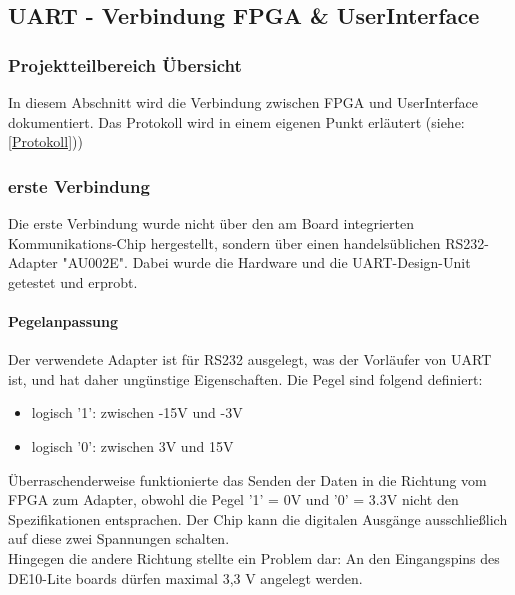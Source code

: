 \subsection{UART - Verbindung FPGA \& UserInterface}
\subsubsection{Projektteilbereich Übersicht}
In diesem Abschnitt wird die Verbindung zwischen FPGA und UserInterface dokumentiert. Das Protokoll wird in einem eigenen Punkt erläutert  (siehe: \ref{Protokoll}))
\subsubsection{erste Verbindung}
Die erste Verbindung wurde nicht über den am Board integrierten Kommunikations-Chip hergestellt, sondern über einen handelsüblichen RS232-Adapter "AU002E". Dabei wurde die Hardware und die UART-Design-Unit getestet und erprobt. 
\paragraph{Pegelanpassung}
Der verwendete Adapter ist für RS232 ausgelegt, was der Vorläufer von UART ist, und hat daher ungünstige Eigenschaften. Die Pegel sind folgend definiert:
\begin{itemize}
	\item
	logisch '1': zwischen -15V und -3V
	\item
	logisch '0': zwischen 3V und 15V
\end{itemize}
Überraschenderweise funktionierte das Senden der Daten in die Richtung vom FPGA zum Adapter, obwohl die Pegel '1' = 0V und '0' = 3.3V nicht den Spezifikationen entsprachen. Der Chip kann die digitalen Ausgänge ausschließlich auf diese zwei Spannungen schalten.\\Hingegen die andere Richtung stellte ein Problem dar: An den Eingangspins des DE10-Lite boards dürfen maximal 3,3 V angelegt werden. 